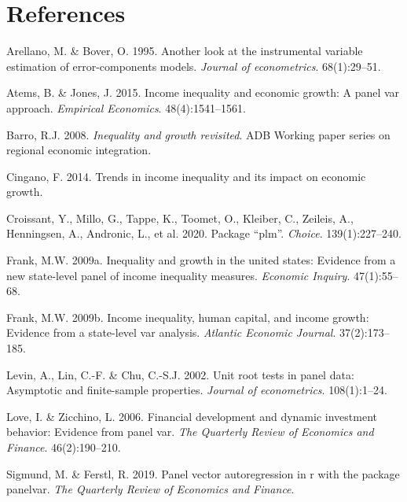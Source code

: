 \documentclass[11pt,preprint, authoryear]{elsarticle}
\numberwithin{equation}{section}
\numberwithin{figure}{section}
\numberwithin{table}{section}
\begin{document}
\newpage

\hypertarget{references}{%
\section*{References}\label{references}}

\hypertarget{refs}{}
\leavevmode\hypertarget{ref-arellano}{}%
Arellano, M. \& Bover, O. 1995. Another look at the instrumental
variable estimation of error-components models. \emph{Journal of
econometrics}. 68(1):29--51.

\leavevmode\hypertarget{ref-atems}{}%
Atems, B. \& Jones, J. 2015. Income inequality and economic growth: A
panel var approach. \emph{Empirical Economics}. 48(4):1541--1561.

\leavevmode\hypertarget{ref-barro}{}%
Barro, R.J. 2008. \emph{Inequality and growth revisited}. ADB Working
paper series on regional economic integration.

\leavevmode\hypertarget{ref-cingano}{}%
Cingano, F. 2014. Trends in income inequality and its impact on economic
growth.

\leavevmode\hypertarget{ref-croissant2020package}{}%
Croissant, Y., Millo, G., Tappe, K., Toomet, O., Kleiber, C., Zeileis,
A., Henningsen, A., Andronic, L., et al. 2020. Package ``plm''.
\emph{Choice}. 139(1):227--240.

\leavevmode\hypertarget{ref-frank}{}%
Frank, M.W. 2009a. Inequality and growth in the united states: Evidence
from a new state-level panel of income inequality measures.
\emph{Economic Inquiry}. 47(1):55--68.

\leavevmode\hypertarget{ref-frankincome}{}%
Frank, M.W. 2009b. Income inequality, human capital, and income growth:
Evidence from a state-level var analysis. \emph{Atlantic Economic
Journal}. 37(2):173--185.

\leavevmode\hypertarget{ref-levin}{}%
Levin, A., Lin, C.-F. \& Chu, C.-S.J. 2002. Unit root tests in panel
data: Asymptotic and finite-sample properties. \emph{Journal of
econometrics}. 108(1):1--24.

\leavevmode\hypertarget{ref-love}{}%
Love, I. \& Zicchino, L. 2006. Financial development and dynamic
investment behavior: Evidence from panel var. \emph{The Quarterly Review
of Economics and Finance}. 46(2):190--210.

\leavevmode\hypertarget{ref-sigmund2019panel}{}%
Sigmund, M. \& Ferstl, R. 2019. Panel vector autoregression in r with
the package panelvar. \emph{The Quarterly Review of Economics and
Finance}.
\end{document}
